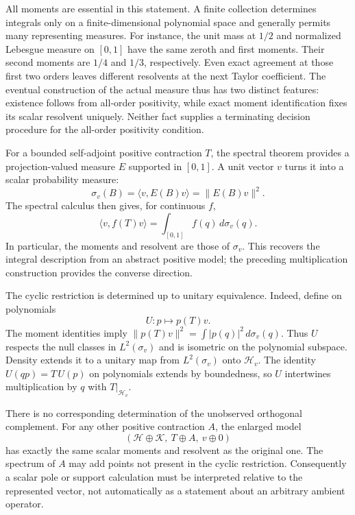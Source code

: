All moments are essential in this statement. A finite collection
determines integrals only on a finite-dimensional polynomial
space and generally permits many representing measures.
For instance, the unit mass at $1/2$ and normalized Lebesgue
measure on $[0,1]$ have the same zeroth and first moments.
Their second moments are $1/4$ and $1/3$, respectively. Even
exact agreement at those first two orders leaves different
resolvents at the next Taylor coefficient.
The eventual construction of the actual measure thus has two
distinct features: existence follows from all-order positivity,
while exact moment identification fixes its scalar resolvent
uniquely. Neither fact supplies a terminating decision procedure
for the all-order positivity condition.

\label{hilb:visible}
For a bounded self-adjoint positive contraction $T$, the spectral
theorem provides a projection-valued measure $E$ supported in
$[0,1]$. A unit vector $v$ turns it into a scalar probability measure:
\[
 \sigma_v(B)=\langle v,E(B)v\rangle=\|E(B)v\|^2.
\]
The spectral calculus then gives, for continuous $f$,
\[
 \langle v,f(T)v\rangle=\int_{[0,1]} f(q)\,d\sigma_v(q).
\]
In particular, the moments and resolvent are those of $\sigma_v$.
This recovers the integral description from an abstract positive
model; the preceding multiplication construction provides the
converse direction.

The cyclic restriction is determined up to unitary equivalence.
Indeed, define on polynomials
\[
 U\colon p\longmapsto p(T)v.
\]
The moment identities imply
$\|p(T)v\|^2=\int|p(q)|^2\,d\sigma_v(q)$.
Thus $U$ respects the null classes in $L^2(\sigma_v)$ and is
isometric on the polynomial subspace. Density extends it to a
unitary map from $L^2(\sigma_v)$ onto $\mathcal H_v$.
The identity $U(qp)=T\,U(p)$ on polynomials extends by
boundedness, so $U$ intertwines multiplication by $q$ with
$T|_{\mathcal H_v}$.

There is no corresponding determination of the unobserved
orthogonal complement. For any other positive contraction $A$,
the enlarged model
\[
 (\mathcal H\oplus\mathcal K,\ T\oplus A,\ v\oplus0)
\]
has exactly the same scalar moments and resolvent as the original
one. The spectrum of $A$ may add points not present in the
cyclic restriction. Consequently a scalar pole or support
calculation must be interpreted relative to the represented
vector, not automatically as a statement about an arbitrary
ambient operator.

